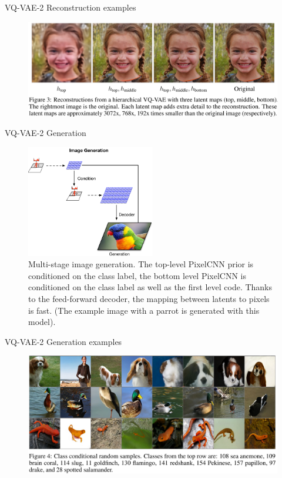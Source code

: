 \documentclass{beamer}
\begin{document}
\begin{frame}{VQ-VAE-2 Reconstruction examples}

\begin{figure}[h]
\includegraphics[width=\textwidth]{img/reconstruction2}
\end{figure}

\end{frame}
\begin{frame}{VQ-VAE-2 Generation}

\begin{figure}[h]
\includegraphics[width=0.5\textwidth]{img/v2-gen}
\caption{Multi-stage image generation. The top-level PixelCNN prior is conditioned on the class label, the bottom level PixelCNN is conditioned on the class label as well as the first level code. Thanks to the feed-forward decoder, the mapping between latents to pixels is fast. (The example image with a parrot is generated with this model).}
\end{figure}

\end{frame}
\begin{frame}{VQ-VAE-2 Generation examples}

\begin{figure}[h]
\includegraphics[width=\textwidth]{img/generated2}
\end{figure}

\end{frame}
\end{document}
